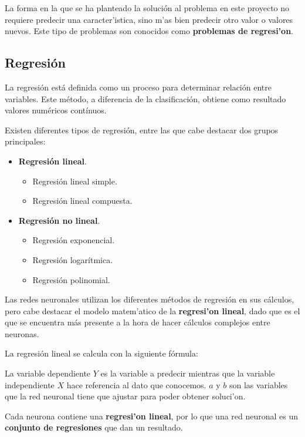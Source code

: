La forma en la que se ha planteado la solución al problema en este proyecto no requiere predecir una caracter'istica, sino m'as bien predecir otro valor o valores nuevos. Este tipo de problemas son conocidos como \textbf{problemas de regresi'on}.

\subsection{Regresi\'on}

La regresión está definida como un proceso para determinar relación entre variables. Este método, a diferencia de la clasificación, obtiene como resultado valores numéricos contínuos.

Existen diferentes tipos de regresión, entre las que cabe destacar dos grupos principales:

\begin{itemize}
\item \textbf{Regresión lineal}. 
	\begin{itemize}
		\item Regresión lineal simple.
		\item Regresión lineal compuesta.
	\end{itemize}
\item \textbf{Regresión no lineal}.
	\begin{itemize}
		\item Regresión exponencial.
		\item Regresión logarítmica.
		\item Regresión polinomial.
	\end{itemize}
\end{itemize} 

Las redes neuronales utilizan los diferentes métodos de regresión en sus cálculos, pero cabe destacar el modelo matem'atico de la \textbf{regresi'on lineal}, dado que es el que se encuentra más presente a la hora de hacer cálculos complejos entre neuronas.

La regresión lineal se calcula con la siguiente fórmula:


La variable dependiente $ Y $ es la variable a predecir mientras que la variable independiente $ X $  hace referencia al dato que conocemos. $ a $ y $ b $ son las variables que la red neuronal tiene que ajustar para poder obtener soluci'on. 

Cada neurona contiene una \textbf{regresi'on lineal}, por lo que una red neuronal es un \textbf{conjunto de regresiones} que dan un resultado. 

